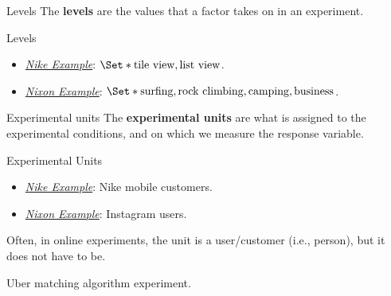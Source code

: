 \begin{Definition}{Levels}{}
      The \textbf{levels} are the values that a factor takes on in an experiment.
\end{Definition}
\begin{Example}{Levels}{}
      \begin{itemize}
            \item \emph{\hyperref[ex:nike_ex]{Nike Example}}: $ \Set*{\text{tile view}, \text{list view}} $.
            \item \emph{\hyperref[ex:nixon_ex]{Nixon Example}}: $ \Set*{\text{surfing}, \text{rock climbing}, \text{camping}, \text{business}} $.
      \end{itemize}
\end{Example}
\begin{Definition}{Experimental units}{}
      The \textbf{experimental units} are what is assigned to the experimental conditions,
      and on which we measure the response variable.
\end{Definition}
\begin{Example}{Experimental Units}{}
      \begin{itemize}
            \item \emph{\hyperref[ex:nike_ex]{Nike Example}}: Nike mobile customers.
            \item \emph{\hyperref[ex:nixon_ex]{Nixon Example}}: Instagram users.
      \end{itemize}
\end{Example}
\begin{Remark}{}{}
      Often, in online experiments, the unit is a user/customer (i.e., person), but it does
      not have to be.
      \begin{Example}{}{}
            Uber matching algorithm experiment.
      \end{Example}
\end{Remark}
